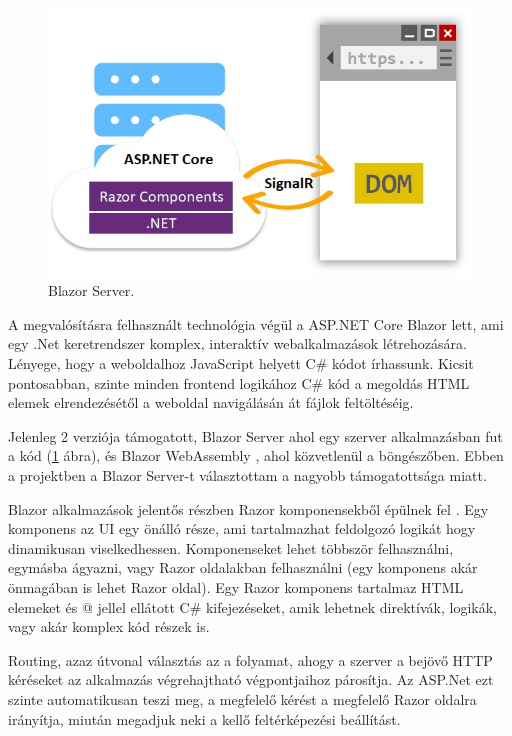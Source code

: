 
\begin{figure}[h]
\centering
\includegraphics[scale=0.5]{images/blazor.jpg}
\caption{Blazor Server. \cite{blazor}}
\label{fig:blazor}
\end{figure}

A megvalósításra felhasznált technológia végül a ASP.NET Core Blazor  \cite{blazor} lett, ami egy .Net \cite{dotnet} keretrendszer komplex, interaktív webalkalmazások létrehozására. Lényege, hogy a weboldalhoz  JavaScript \cite{js} helyett C\# \cite{csharp} kódot írhassunk. Kicsit pontosabban, szinte minden frontend logikához C\# kód a megoldás HTML \cite{html} elemek elrendezésétől a weboldal navigálásán át fájlok feltöltéséig.

Jelenleg 2 verziója támogatott, Blazor Server  \cite{blazor_h} ahol egy szerver alkalmazásban fut a kód (\ref{fig:blazor} ábra), és Blazor WebAssembly \cite{blazor_h}, ahol közvetlenül a böngészőben. Ebben a projektben a Blazor Server-t választottam a nagyobb támogatottsága miatt.

Blazor alkalmazások jelentős részben Razor komponensekből épülnek fel \cite{razor}. Egy komponens az UI egy önálló része, ami tartalmazhat feldolgozó logikát hogy dinamikusan viselkedhessen. Komponenseket lehet többször felhasználni, egymásba ágyazni, vagy Razor oldalakban felhasználni (egy komponens akár önmagában is lehet Razor oldal). Egy Razor komponens tartalmaz HTML elemeket és @ jellel ellátott C\# kifejezéseket, amik lehetnek direktívák, logikák, vagy akár komplex kód részek is.

Routing, azaz útvonal választás az a folyamat, ahogy a szerver a bejövő HTTP kéréseket az alkalmazás végrehajtható végpontjaihoz párosítja. Az ASP.Net ezt szinte automatikusan teszi meg, a megfelelő kérést a megfelelő Razor oldalra irányítja, miután megadjuk neki a kellő feltérképezési beállítást. 

